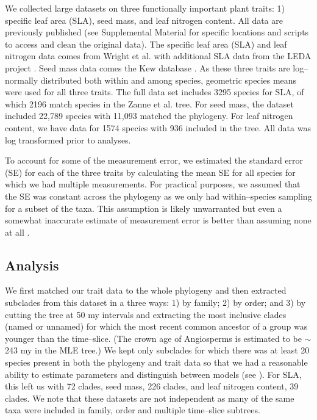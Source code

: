 \documentclass[a4paper,12pt]{article}
\begin{document}
We collected large datasets on three functionally important plant traits: 1) specific leaf area (SLA), seed mass, and leaf nitrogen content. All data are previously published (see Supplemental Material for specific locations and scripts to access and clean the original data). The specific leaf area (SLA) and leaf nitrogen data comes from Wright et al. \citep{Wright2004} with additional SLA data from the LEDA project \citep{Kleyer2008}. Seed mass data comes the Kew database \citep{Kew2008}. As these three traits are log--normally distributed both within and among species, geometric species means were used for all three traits. 
The full data set includes 3295 species for SLA, of which 2196 match species in the Zanne et al. tree. For seed mass, the dataset included 22,789 species with 11,093 matched the phylogeny. For leaf nitrogen content, we have data for 1574 species with 936 included in the tree. All data was log transformed prior to analyses.

To account for some of the measurement error, we estimated the standard error (SE) for each of the three traits by calculating the mean SE for all species for which we had multiple measurements. For practical purposes, we assumed that the SE was constant across the phylogeny as we only had within--species sampling for a subset of the taxa. This assumption is likely unwarranted but even a somewhat inaccurate estimate of measurement error is better than assuming none at all \citep{Hansen2012}.

\subsection{Analysis}

We first matched our trait data to the whole phylogeny and then extracted subclades from this dataset in a three ways: 1) by family; 2) by order; and 3) by cutting the tree at 50 my intervals and extracting the most inclusive clades (named or unnamed) for which the most recent common ancestor of a group was younger than the time--slice. 
(The crown age of Angiosperms is estimated to be $\sim$243 my in the MLE tree.) We kept only subclades for which there was at least 20 species present in both the phylogeny and trait data so that we had a reasonable ability to estimate parameters and distinguish between models (see \citep{Boettiger2012, SlaterPennell}). 
For SLA, this left us with 72 clades, seed mass, 226 clades, and leaf nitrogen content, 39 clades. We note that these datasets are not independent as many of the same taxa were included in family, order and multiple time--slice subtrees. 
\end{document}
